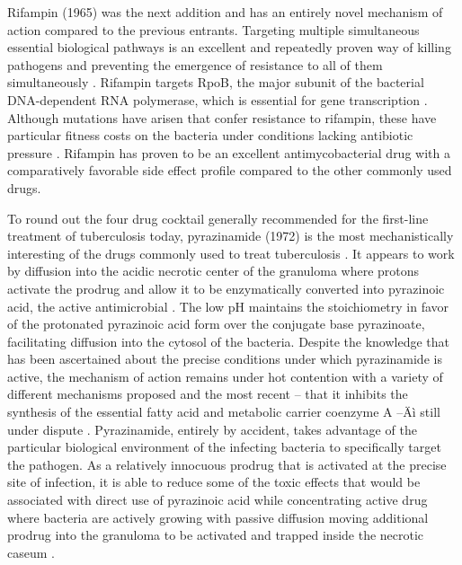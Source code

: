 Rifampin (1965) was the next addition and has an entirely novel mechanism of action compared to the previous entrants. Targeting multiple simultaneous essential biological pathways is an excellent and repeatedly proven way of killing pathogens and preventing the emergence of resistance to all of them simultaneously \citep{Pletz2017}. Rifampin targets RpoB, the major subunit of the bacterial DNA-dependent RNA polymerase, which is essential for gene transcription \citep{Wehrli1983}. Although mutations have arisen that confer resistance to rifampin, these have particular fitness costs on the bacteria under conditions lacking antibiotic pressure \citep{Mariam2004, Xu2021, Gagneux2006, Billington1999, Gagneux2009}. Rifampin has proven to be an excellent antimycobacterial drug with a comparatively favorable side effect profile compared to the other commonly used drugs.

To round out the four drug cocktail generally recommended for the first-line treatment of tuberculosis today, pyrazinamide (1972) is the most mechanistically interesting of the drugs commonly used to treat tuberculosis \citep{Yeager1952, Steele1988, Millard2019}. It appears to work by diffusion into the acidic necrotic center of the granuloma where protons activate the prodrug and allow it to be enzymatically converted into pyrazinoic acid, the active antimicrobial \citep{Zhang2013, Zhang2019, Kalinda2012, Lamont2020, Lamont2019}. The low pH maintains the stoichiometry in favor of the protonated pyrazinoic acid form over the conjugate base pyrazinoate, facilitating diffusion into the cytosol of the bacteria. Despite the knowledge that has been ascertained about the precise conditions under which pyrazinamide is active, the mechanism of action remains under hot contention with a variety of different mechanisms proposed and the most recent -- that it inhibits the synthesis of the essential fatty acid and metabolic carrier coenzyme A --Äì still under dispute \citep{Kalinda2012, Shi2011, Lamont2020, Dillon2017}. Pyrazinamide, entirely by accident, takes advantage of the particular biological environment of the infecting bacteria to specifically target the pathogen. As a relatively innocuous prodrug that is activated at the precise site of infection, it is able to reduce some of the toxic effects that would be associated with direct use of pyrazinoic acid while concentrating active drug where bacteria are actively growing with passive diffusion moving additional prodrug into the granuloma to be activated and trapped inside the necrotic caseum \citep{Wade2004, Gopal2016}.

